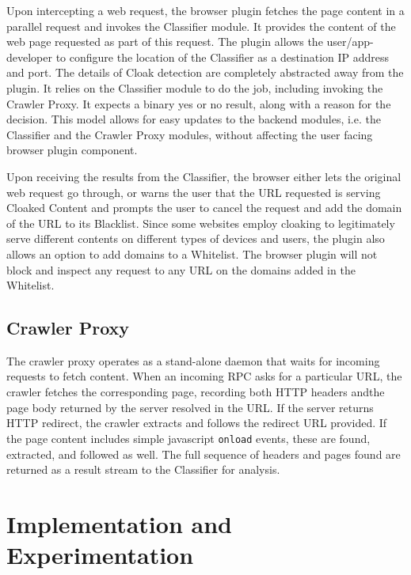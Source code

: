 \documentclass[letterpaper,twocolumn,10pt]{article}
\begin{document}

Upon intercepting a web request, the browser plugin fetches the page content in a parallel request and invokes the Classifier module. It provides the content of the web page requested as part of this request. The plugin allows the user/app-developer to configure the location of the Classifier as a destination IP address and port. The details of Cloak detection are completely abstracted away from the plugin. It relies on the Classifier module to do the job, including invoking the Crawler Proxy. It expects a binary yes or no result, along with a reason for the decision. This model allows for easy updates to the backend modules, i.e. the Classifier and the Crawler Proxy modules, without affecting the user facing browser plugin component.

Upon receiving the results from the Classifier, the browser either lets the original web request go through, or warns the user that the URL requested is serving Cloaked Content and prompts the user to cancel the request and add the domain of the URL to its Blacklist. Since some websites employ cloaking to legitimately serve different contents on different types of devices and users, the plugin also allows an option to add domains to a Whitelist. The browser plugin will not block and inspect any request to any URL on the domains added in the Whitelist.

\subsection{Crawler Proxy}
The crawler proxy operates as a stand-alone daemon that waits for incoming requests to fetch content.  When an incoming RPC asks for a particular URL, the crawler fetches the corresponding page, recording both HTTP headers andthe page body returned by the server resolved in the URL.  If the server returns HTTP redirect, the crawler extracts and follows the redirect URL provided.  If the page content includes simple javascript \texttt{onload} events, these are found, extracted, and followed as well.  The full sequence of headers and pages found are returned as a result stream to the Classifier for analysis.

\section{Implementation and Experimentation}
\end{document}
